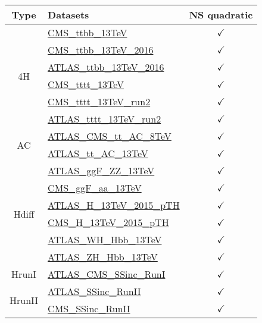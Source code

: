 \documentclass{article}
\begin{document}
\begin{table}[H]
\footnotesize
\centering
\begin{tabular}{|c|l|c|}
\hline
 Type & Datasets  & NS quadratic \\ \hline
\multirow{6}{*}{4H}
 & \href{https://arxiv.org/abs/1705.10141}{CMS_ttbb_13TeV}  & $\checkmark$\\ \cline{2-3}
 & \href{https://arxiv.org/abs/1909.05306}{CMS_ttbb_13TeV_2016}  & $\checkmark$\\ \cline{2-3}
 & \href{https://arxiv.org/abs/1811.12113}{ATLAS_ttbb_13TeV_2016}  & $\checkmark$\\ \cline{2-3}
 & \href{https://arxiv.org/abs/1710.10614}{CMS_tttt_13TeV}  & $\checkmark$\\ \cline{2-3}
 & \href{https://arxiv.org/abs/1908.06463}{CMS_tttt_13TeV_run2}  & $\checkmark$\\ \cline{2-3}
 & \href{https://arxiv.org/abs/2007.14858}{ATLAS_tttt_13TeV_run2}  & $\checkmark$
\\ \hline
\multirow{2}{*}{AC}
 & \href{https://arxiv.org/abs/1709.05327}{ATLAS_CMS_tt_AC_8TeV}  & $\checkmark$\\ \cline{2-3}
 & \href{https://cds.cern.ch/record/2682109}{ATLAS_tt_AC_13TeV}  & $\checkmark$
\\ \hline
\multirow{6}{*}{Hdiff}
 & \href{https://arxiv.org/abs/1909.02845}{ATLAS_ggF_ZZ_13TeV}  & $\checkmark$\\ \cline{2-3}
 & \href{https://inspirehep.net/literature/1725274}{CMS_ggF_aa_13TeV}  & $\checkmark$\\ \cline{2-3}
 & \href{https://inspirehep.net/literature/1743896}{ATLAS_H_13TeV_2015_pTH}  & $\checkmark$\\ \cline{2-3}
 & \href{https://arxiv.org/abs/1812.06504}{CMS_H_13TeV_2015_pTH}  & $\checkmark$\\ \cline{2-3}
 & \href{https://arxiv.org/abs/1903.04618}{ATLAS_WH_Hbb_13TeV}  & $\checkmark$\\ \cline{2-3}
 & \href{https://arxiv.org/abs/1903.04618}{ATLAS_ZH_Hbb_13TeV}  & $\checkmark$
\\ \hline
\multirow{1}{*}{HrunI}
 & \href{https://arxiv.org/abs/1606.02266}{ATLAS_CMS_SSinc_RunI}  & $\checkmark$
\\ \hline
\multirow{2}{*}{HrunII}
 & \href{https://arxiv.org/abs/1909.02845}{ATLAS_SSinc_RunII}  & $\checkmark$\\ \cline{2-3}
 & \href{https://arxiv.org/abs/1809.10733}{CMS_SSinc_RunII}  & $\checkmark$
\\ \hline

\end{tabular}
\end{table}
\end{document}
